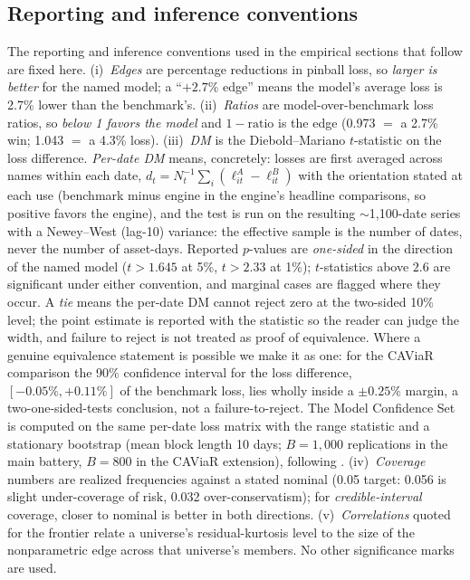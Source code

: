 \documentclass[11pt]{article}
\theoremstyle{remark}
\begin{document}
\subsection{Reporting and inference conventions}
The reporting and inference conventions used in the empirical sections that follow are fixed here. (i)~\emph{Edges} are percentage
reductions in pinball loss, so \emph{larger is better} for the named
model; a ``$+2.7\%$ edge'' means the model's average loss is 2.7\%
lower than the benchmark's. (ii)~\emph{Ratios} are model-over-benchmark
loss ratios, so \emph{below 1 favors the model} and $1-\text{ratio}$ is
the edge (0.973 $=$ a 2.7\% win; 1.043 $=$ a 4.3\% loss).
(iii)~\emph{DM} is the Diebold--Mariano $t$-statistic on the loss
difference. \emph{Per-date DM} means, concretely: losses are first
averaged across names within each date,
$d_t = N_t^{-1}\sum_i (\ell^{A}_{it} - \ell^{B}_{it})$ with the
orientation stated at each use (benchmark minus engine in the engine's
headline comparisons, so positive favors the engine), and the test is
run on the resulting $\sim$1{,}100-date series with a Newey--West
(lag-10) variance: the effective sample is the number of dates, never
the number of asset-days. Reported $p$-values are \emph{one-sided} in
the direction of the named model ($t>1.645$ at 5\%, $t>2.33$ at 1\%);
$t$-statistics above $2.6$ are significant under either convention, and
marginal cases are flagged where they occur. A \emph{tie} means the
per-date DM cannot reject zero at the two-sided 10\% level; the point
estimate is reported with the statistic so the reader can judge the
width, and failure to reject is not treated as proof of equivalence.
Where a genuine equivalence statement is possible we make it as one: for the CAViaR comparison the 90\% confidence interval for
the loss difference, $[-0.05\%,+0.11\%]$ of the benchmark loss, lies wholly inside a $\pm0.25\%$ margin, a two-one-sided-tests conclusion, not a failure-to-reject. The Model Confidence Set is
computed on the same per-date loss matrix with the range statistic and a
stationary bootstrap (mean block length 10 days; $B=1{,}000$ replications
in the main battery, $B=800$ in the CAViaR extension),
following \citet{hansen2011mcs}. (iv)~\emph{Coverage}
numbers are realized frequencies against a stated nominal (0.05 target:
0.056 is slight under-coverage of risk, 0.032 over-conservatism); for
\emph{credible-interval} coverage, closer to nominal is better in both
directions. (v)~\emph{Correlations} quoted for the frontier relate a universe's
residual-kurtosis level to the size of the nonparametric edge across
that universe's members. No other significance marks are used.
\end{document}
